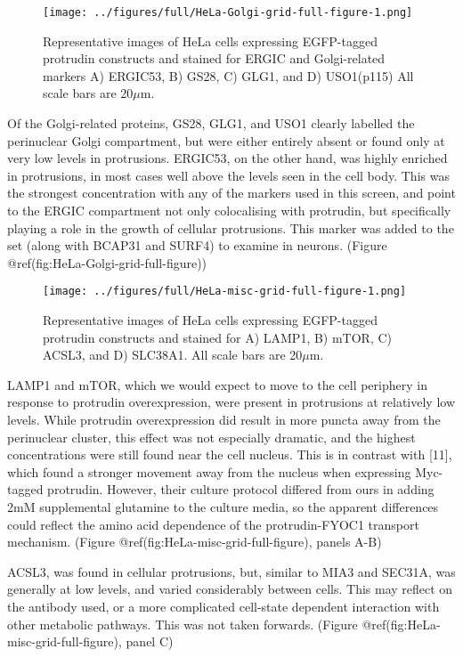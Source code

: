 \documentclass[
  12pt,
  a4paper,
]{article}
\begin{document}
\begin{figure}
\centering
\texttt{[image: ../figures/full/HeLa-Golgi-grid-full-figure-1.png]}
\caption{Representative images of HeLa cells expressing EGFP-tagged
protrudin constructs and stained for ERGIC and Golgi-related markers A)
ERGIC53, B) GS28, C) GLG1, and D) USO1(p115) All scale bars are
20\(\mu\)m.}
\end{figure}

Of the Golgi-related proteins, GS28, GLG1, and USO1 clearly labelled the
perinuclear Golgi compartment, but were either entirely absent or found
only at very low levels in protrusions. ERGIC53, on the other hand, was
highly enriched in protrusions, in most cases well above the levels seen
in the cell body. This was the strongest concentration with any of the
markers used in this screen, and point to the ERGIC compartment not only
colocalising with protrudin, but specifically playing a role in the
growth of cellular protrusions. This marker was added to the set (along
with BCAP31 and SURF4) to examine in neurons. (Figure
@ref(fig:HeLa-Golgi-grid-full-figure))

\begin{figure}
\centering
\texttt{[image: ../figures/full/HeLa-misc-grid-full-figure-1.png]}
\caption{Representative images of HeLa cells expressing EGFP-tagged
protrudin constructs and stained for A) LAMP1, B) mTOR, C) ACSL3, and D)
SLC38A1. All scale bars are 20\(\mu\)m.}
\end{figure}

LAMP1 and mTOR, which we would expect to move to the cell periphery in
response to protrudin overexpression, were present in protrusions at
relatively low levels. While protrudin overexpression did result in more
puncta away from the perinuclear cluster, this effect was not especially
dramatic, and the highest concentrations were still found near the cell
nucleus. This is in contrast with {[}11{]}, which found a stronger
movement away from the nucleus when expressing Myc-tagged protrudin.
However, their culture protocol differed from ours in adding 2mM
supplemental glutamine to the culture media, so the apparent differences
could reflect the amino acid dependence of the protrudin-FYOC1 transport
mechanism. (Figure @ref(fig:HeLa-misc-grid-full-figure), panels A-B)

ACSL3, was found in cellular protrusions, but, similar to MIA3 and
SEC31A, was generally at low levels, and varied considerably between
cells. This may reflect on the antibody used, or a more complicated
cell-state dependent interaction with other metabolic pathways. This was
not taken forwards. (Figure @ref(fig:HeLa-misc-grid-full-figure), panel
C)
\end{document}
